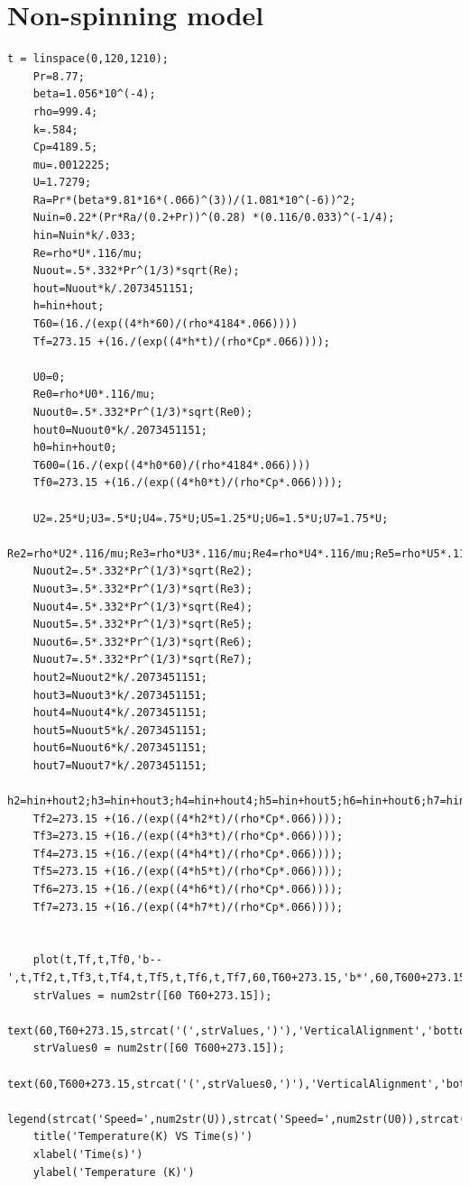\documentclass{report}
\begin{document}
	\section{Non-spinning model}\label{codeS}
	
	\begin{lstlisting}[style=Matlab-editor]
	t = linspace(0,120,1210);
	Pr=8.77;
	beta=1.056*10^(-4);
	rho=999.4;
	k=.584;
	Cp=4189.5;
	mu=.0012225;
	U=1.7279;
	Ra=Pr*(beta*9.81*16*(.066)^(3))/(1.081*10^(-6))^2;
	Nuin=0.22*(Pr*Ra/(0.2+Pr))^(0.28) *(0.116/0.033)^(-1/4);
	hin=Nuin*k/.033;
	Re=rho*U*.116/mu;
	Nuout=.5*.332*Pr^(1/3)*sqrt(Re);
	hout=Nuout*k/.2073451151;
	h=hin+hout;
	T60=(16./(exp((4*h*60)/(rho*4184*.066))))
	Tf=273.15 +(16./(exp((4*h*t)/(rho*Cp*.066))));
	
	U0=0;
	Re0=rho*U0*.116/mu;
	Nuout0=.5*.332*Pr^(1/3)*sqrt(Re0);
	hout0=Nuout0*k/.2073451151;
	h0=hin+hout0;
	T600=(16./(exp((4*h0*60)/(rho*4184*.066))))
	Tf0=273.15 +(16./(exp((4*h0*t)/(rho*Cp*.066))));
	
	U2=.25*U;U3=.5*U;U4=.75*U;U5=1.25*U;U6=1.5*U;U7=1.75*U;
	Re2=rho*U2*.116/mu;Re3=rho*U3*.116/mu;Re4=rho*U4*.116/mu;Re5=rho*U5*.116/mu;Re6=rho*U6*.116/mu;Re7=rho*U7*.116/mu;
	Nuout2=.5*.332*Pr^(1/3)*sqrt(Re2);
	Nuout3=.5*.332*Pr^(1/3)*sqrt(Re3);
	Nuout4=.5*.332*Pr^(1/3)*sqrt(Re4);
	Nuout5=.5*.332*Pr^(1/3)*sqrt(Re5);
	Nuout6=.5*.332*Pr^(1/3)*sqrt(Re6);
	Nuout7=.5*.332*Pr^(1/3)*sqrt(Re7);
	hout2=Nuout2*k/.2073451151;
	hout3=Nuout3*k/.2073451151;
	hout4=Nuout4*k/.2073451151;
	hout5=Nuout5*k/.2073451151;
	hout6=Nuout6*k/.2073451151;
	hout7=Nuout7*k/.2073451151;
	h2=hin+hout2;h3=hin+hout3;h4=hin+hout4;h5=hin+hout5;h6=hin+hout6;h7=hin+hout7;
	Tf2=273.15 +(16./(exp((4*h2*t)/(rho*Cp*.066))));
	Tf3=273.15 +(16./(exp((4*h3*t)/(rho*Cp*.066))));
	Tf4=273.15 +(16./(exp((4*h4*t)/(rho*Cp*.066))));
	Tf5=273.15 +(16./(exp((4*h5*t)/(rho*Cp*.066))));
	Tf6=273.15 +(16./(exp((4*h6*t)/(rho*Cp*.066))));
	Tf7=273.15 +(16./(exp((4*h7*t)/(rho*Cp*.066))));
	
	
	plot(t,Tf,t,Tf0,'b--',t,Tf2,t,Tf3,t,Tf4,t,Tf5,t,Tf6,t,Tf7,60,T60+273.15,'b*',60,T600+273.15,'b*')
	strValues = num2str([60 T60+273.15]);
	text(60,T60+273.15,strcat('(',strValues,')'),'VerticalAlignment','bottom');
	strValues0 = num2str([60 T600+273.15]);
	text(60,T600+273.15,strcat('(',strValues0,')'),'VerticalAlignment','bottom');
	legend(strcat('Speed=',num2str(U)),strcat('Speed=',num2str(U0)),strcat('Speed=',num2str(U2)),strcat('Speed=',num2str(U3)),strcat('Speed=',num2str(U4)),strcat('Speed=',num2str(U5)),strcat('Speed=',num2str(U6)),strcat('Speed=',num2str(U7)));
	title('Temperature(K) VS Time(s)')
	xlabel('Time(s)')
	ylabel('Temperature (K)')
	\end{lstlisting}
	
	
	{}
	
	
\end{document}
